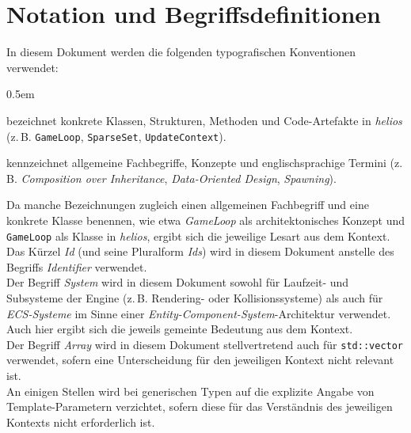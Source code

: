 \chapter*{Notation und Begriffsdefinitionen}

In diesem Dokument werden die folgenden typografischen Konventionen verwendet:

\begin{description}
    \itemsep0.5em
    \item[\texttt{Nichtproportionale Schrift}] bezeichnet konkrete Klassen, Strukturen, Methoden und Code-Artefakte in \textit{helios} (z.\,B. \texttt{GameLoop}, \texttt{SparseSet}, \texttt{UpdateContext}).

    \item[\textit{Kursive Schrift}] kennzeichnet allgemeine Fachbegriffe, Konzepte und englischsprachige Termini (z.\,B. \textit{Composition over Inheritance}, \textit{Data-Oriented Design}, \textit{Spawning}).
\end{description}

Da manche Bezeichnungen zugleich einen allgemeinen Fachbegriff und eine konkrete Klasse benennen, wie etwa \textit{GameLoop} als architektonisches Konzept und \texttt{GameLoop} als Klasse in \textit{helios}, ergibt sich die jeweilige Lesart aus dem Kontext.\\

Das Kürzel \textit{Id} (und seine Pluralform \textit{Ids}) wird in diesem Dokument anstelle des Begriffs \textit{Identifier} verwendet.\\

Der Begriff \textit{System} wird in diesem Dokument sowohl für Laufzeit- und Subsysteme der Engine (z.\,B. Rendering- oder Kollisionssysteme) als auch für \textit{ECS-Systeme} im Sinne einer \textit{Entity-Component-System}-Architektur verwendet.
Auch hier ergibt sich die jeweils gemeinte Bedeutung aus dem Kontext.\\

Der Begriff \textit{Array} wird in diesem Dokument stellvertretend auch für \texttt{std::vector} verwendet, sofern eine Unterscheidung für den jeweiligen Kontext nicht relevant ist.\\

An einigen Stellen wird bei generischen Typen auf die explizite Angabe von Template-Parametern verzichtet, sofern diese für das Verständnis des jeweiligen Kontexts nicht erforderlich ist.\\

